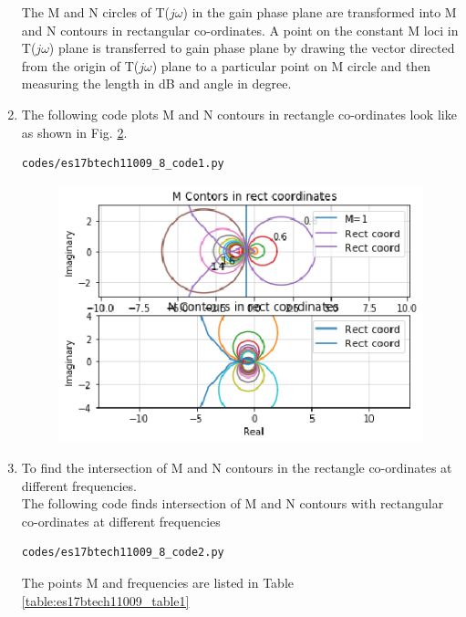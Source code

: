 \begin{enumerate}[label=\thesection.\arabic*.,ref=\thesection.\theenumi]
\begin{figure}[!h]
\caption{}
\label{fig:es17btech11009_fig8}
\end{figure}
The M and N circles of T($j\omega$) in the gain phase plane are transformed into M and N contours in rectangular co-ordinates. A point on the constant M loci in T($j\omega$) plane is transferred to gain phase plane by drawing the vector directed from the origin of T($j\omega$) plane to a particular point on M circle and then measuring the length in dB and angle in degree.
\item
The following code plots  M and N contours in rectangle co-ordinates look like as shown in Fig. \ref{fig:es17btech11009_8_1}.
\begin{lstlisting}
codes/es17btech11009_8_code1.py
\end{lstlisting}

\begin{figure}[!h]
\includegraphics[width=\columnwidth]{./figs/es17btech11009_8_fig1.eps}
\caption{}
\label{fig:es17btech11009_8_1}
\end{figure}
\item
To find the intersection of M and N contours in the rectangle co-ordinates at different frequencies. \\
\solution 
The following code finds intersection of M and N contours with rectangular co-ordinates at different frequencies
\begin{lstlisting}
codes/es17btech11009_8_code2.py
\end{lstlisting}
The points M and frequencies are listed in Table  \ref{table:es17btech11009_table1}
\begin{table}[!ht]
\centering

\caption{}

\end{table}
\end{enumerate}
